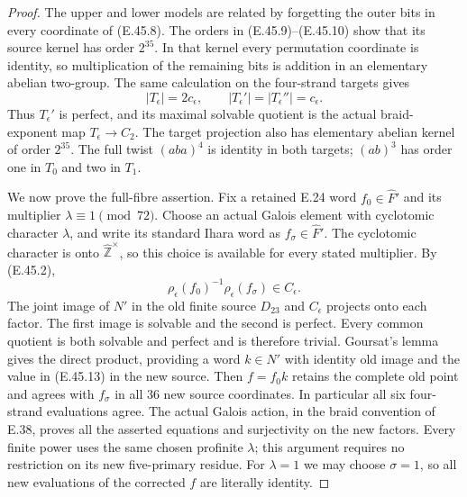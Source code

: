 \begin{proof}
The upper and lower models are related by forgetting the outer
bits in every coordinate of \textup{(E.45.8)}.  The orders in
\textup{(E.45.9)}--\textup{(E.45.10)} show that its source kernel
has order $2^{35}$.  In that kernel every permutation coordinate
is identity, so multiplication of the remaining bits is addition
in an elementary abelian two-group.  The same calculation on
the four-strand targets gives
\[
       |T_\epsilon|=2c_\epsilon,
       \qquad |T_\epsilon'|=|T_\epsilon''|=c_\epsilon.
 \tag{E.45.12}
\]
Thus $T_\epsilon'$ is perfect, and its maximal solvable quotient
is the actual braid-exponent map $T_\epsilon\to C_2$.
The target projection also has elementary abelian kernel of
order $2^{35}$.  The full twist $(aba)^4$ is identity in both
targets; $(ab)^3$ has order one in $T_0$ and two in $T_1$.

We now prove the full-fibre assertion.
Fix a retained E.24 word $f_0\in\widehat F'$ and its multiplier
$\lambda\equiv1\pmod{72}$.  Choose an actual Galois element
with cyclotomic character $\lambda$, and write its standard
Ihara word as $f_\sigma\in\widehat F'$.
The cyclotomic character is onto $\widehat{\mathbb Z}^{\times}$,
so this choice is available for every stated multiplier.
By \textup{(E.45.2)},
\[
       \rho_\epsilon(f_0)^{-1}\rho_\epsilon(f_\sigma)
                                 \in C_\epsilon.
 \tag{E.45.13}
\]
The joint image of $N'$ in the old finite source $D_{23}$
and $C_\epsilon$ projects onto each factor.  The first image
is solvable and the second is perfect.  Every common quotient
is both solvable and perfect and is therefore trivial.
Goursat's lemma gives the direct product, providing a word
$k\in N'$ with identity old image and the value in
\textup{(E.45.13)} in the new source.  Then $f=f_0k$
retains the complete old point and agrees with $f_\sigma$
in all $36$ new source coordinates.  In particular all six
four-strand evaluations agree.  The actual Galois action,
in the braid convention of E.38, proves all the asserted
equations and surjectivity on the new factors.  Every finite
power uses the same chosen profinite $\lambda$; this argument
requires no restriction on its new five-primary residue.
For $\lambda=1$ we may choose $\sigma=1$, so all new evaluations
of the corrected $f$ are literally identity.


\end{proof}
